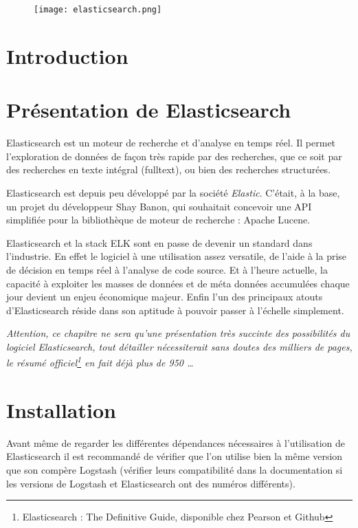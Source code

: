 
\begin{figure}[H]
\center
\texttt{[image: elasticsearch.png]}
\label{fig:elasticsearchlogo.png}
\end{figure}
\section{Introduction}

\section{Présentation de Elasticsearch}
Elasticsearch est un moteur de recherche et d'analyse en temps réel. Il permet l'exploration
de données de façon très rapide par des recherches, que ce soit par des recherches
en texte intégral (\gls{fulltext}), ou bien des recherches structurées.

Elasticsearch est depuis peu développé par la société \emph{Elastic}. C'était, à 
la base, un projet du développeur Shay Banon, qui souhaitait concevoir une API simplifiée
pour la bibliothèque de moteur de recherche : Apache Lucene.

Elasticsearch et la stack ELK sont en passe de devenir un standard dans l'industrie.
En effet le logiciel à une utilisation assez versatile, de l'aide à la prise de 
décision en temps réel à l'analyse de code source. Et à l'heure actuelle, la capacité 
à exploiter les masses de données et de méta données accumulées chaque jour devient 
un enjeu économique majeur. Enfin l'un des principaux 
atouts d'Elasticsearch réside dans son aptitude à pouvoir passer à l'échelle simplement.

{\footnotesize\emph{Attention, ce chapitre ne sera qu'une présentation très succinte des possibilités 
du logiciel Elasticsearch, tout détailler nécessiterait \emph{sans doutes} des milliers
de pages, le résumé officiel\footnote{Elasticsearch : The Definitive Guide, disponible 
chez Pearson et Github}
en fait déjà \emph{plus de 950} \ldots}}

\section{Installation}
Avant même de regarder les différentes dépendances nécessaires à l'utilisation de
Elasticsearch il est recommandé de vérifier que l'on utilise bien la même version
que son compère Logstash (vérifier leurs compatibilité dans la documentation si les
versions de Logstash et Elasticsearch ont des numéros différents).

